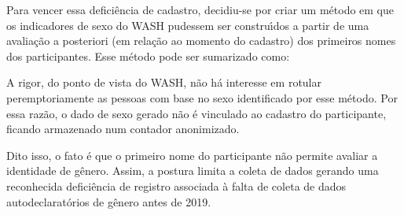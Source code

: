 \documentclass[
12pt,		%
openright,	%
twoside,  %
a4paper,			%
chapter=TITLE,		%
english,			%
french,				%
spanish,			%
brazil				%
]{USPSC-classe/USPSC}
\begin{document}
Para vencer essa defici\^encia de cadastro, decidiu-se por criar um m\'etodo em que os indicadores de sexo do WASH pudessem ser constru\'{\i}dos a partir de uma avalia\c{c}\~ao a posteriori (em rela\c{c}\~ao ao momento do cadastro) dos primeiros nomes dos participantes. Esse m\'etodo pode ser sumarizado como:


















\noindent\begin{center}\mbox{\centering{}}\end{center}


A rigor, do ponto de vista do WASH, n\~ao h\'a interesse em rotular peremptoriamente as pessoas com base no sexo identificado por esse m\'etodo. Por essa raz\~ao, o dado de sexo gerado n\~ao \'e vinculado ao cadastro do participante, ficando armazenado num contador anonimizado.

















Dito isso, o fato \'e que o primeiro nome do participante n\~ao permite avaliar a identidade de g\^enero. Assim, a postura limita a coleta de dados gerando uma reconhecida defici\^encia de registro associada \`a falta de coleta de dados autodeclarat\'orios de g\^enero antes de 2019.
\end{document}
